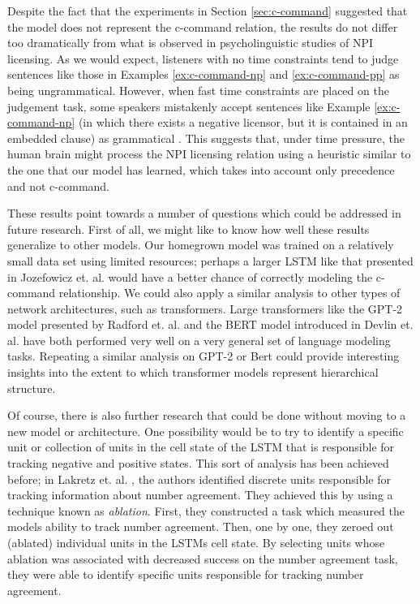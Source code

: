 \documentclass[11pt, round]{article}
\begin{document}
Despite the fact that the experiments in Section \ref{sec:c-command} suggested that the model does not represent the c-command relation, the results do not differ too dramatically from what is observed in psycholinguistic studies of NPI licensing. As we would expect, listeners with no time constraints tend to judge sentences like those in Examples \ref{ex:c-command-np} and \ref{ex:c-command-pp} as being ungrammatical. However, when fast time constraints are placed on the judgement task, some speakers mistakenly accept sentences like Example \ref{ex:c-command-np} (in which there exists a negative licensor, but it is contained in an embedded clause) as grammatical \cite{xiang2009illusory,xiang2013dependency,parker2016negative}. This suggests that, under time pressure, the human brain might process the NPI licensing relation using a heuristic similar to the one that our model has learned, which takes into account only precedence and not c-command.

These results point towards a number of questions which could be addressed in future research. First of all, we might like to know how well these results generalize to other models. Our homegrown model was trained on a relatively small data set using limited resources; perhaps a larger LSTM like that presented in Jozefowicz et. al.  would have a better chance of correctly modeling the c-command relationship. We could also apply a similar analysis to other types of network architectures, such as transformers. Large transformers like the GPT-2 model presented by Radford et. al.  and the BERT model introduced in Devlin et. al.  have both performed very well on a very general set of language modeling tasks. Repeating a similar analysis on GPT-2 or Bert could provide interesting insights into the extent to which transformer models represent hierarchical structure.

Of course, there is also further research that could be done without moving to a new model or architecture. One possibility would be to try to identify a specific unit or collection of units in the cell state of the LSTM that is responsible for tracking negative and positive states. This sort of analysis has been achieved before; in Lakretz et. al. , the authors identified discrete units responsible for tracking information about number agreement. They achieved this by using a technique known as \textit{ablation}. First, they constructed a task which measured the models ability to track number agreement. Then, one by one, they zeroed out (ablated) individual units in the LSTMs cell state. By selecting units whose ablation was associated with decreased success on the number agreement task, they were able to identify specific units responsible for tracking number agreement.
\end{document}
